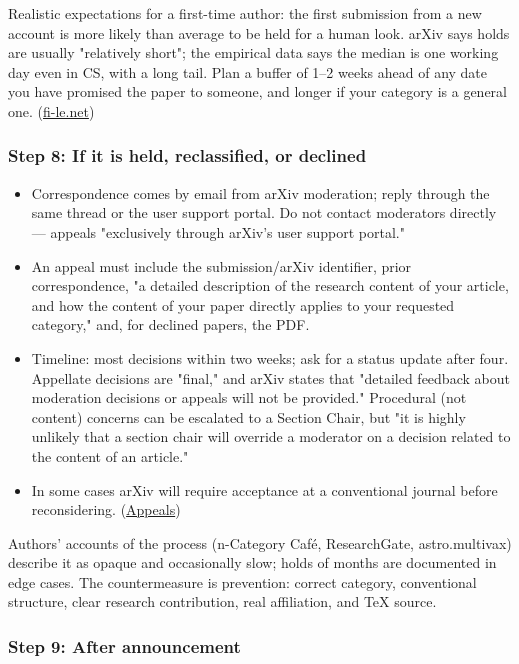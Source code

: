 \documentclass[twocolumn,10pt,letterpaper]{article}
\begin{document}
Realistic expectations for a first-time author: the first submission from a new account is more likely than average to be held for a human look. arXiv says holds are usually "relatively short"; the empirical data says the median is one working day even in CS, with a long tail. Plan a buffer of 1–2 weeks ahead of any date you have promised the paper to someone, and longer if your category is a general one. (\href{https://fi-le.net/arxiv/}{fi-le.net})


\subsubsection{Step 8: If it is held, reclassified, or declined}

\begin{itemize}
\setlength{\itemsep}{0pt}
\setlength{\parskip}{0pt}
  \item Correspondence comes by email from arXiv moderation; reply through the same thread or the user support portal. Do not contact moderators directly — appeals "exclusively through arXiv's user support portal."
  \item An appeal must include the submission/arXiv identifier, prior correspondence, "a detailed description of the research content of your article, and how the content of your paper directly applies to your requested category," and, for declined papers, the PDF.
  \item Timeline: most decisions within two weeks; ask for a status update after four. Appellate decisions are "final," and arXiv states that "detailed feedback about moderation decisions or appeals will not be provided." Procedural (not content) concerns can be escalated to a Section Chair, but "it is highly unlikely that a section chair will override a moderator on a decision related to the content of an article."
  \item In some cases arXiv will require acceptance at a conventional journal before reconsidering. (\href{https://info.arxiv.org/help/moderation/appeals.html}{Appeals})
\end{itemize}

Authors' accounts of the process (n-Category Café, ResearchGate, astro.multivax) describe it as opaque and occasionally slow; holds of months are documented in edge cases. The countermeasure is prevention: correct category, conventional structure, clear research contribution, real affiliation, and TeX source.


\subsubsection{Step 9: After announcement}
\end{document}
